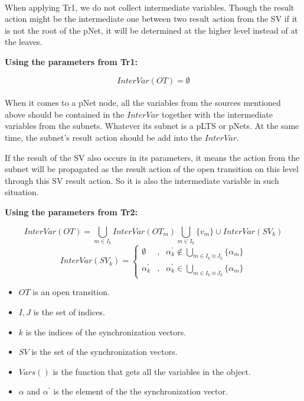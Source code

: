 \documentclass{lncs/llncs}
\begin{document}
\begin{definition}
\paragraph{}
When applying Tr1, we do not collect intermediate variables. Though the result action might be the intermediate one between two result action from the SV if it is not the root of the pNet, it will be determined at the higher level instead of at the leaves.

\begin{description}
	\item[{\bf Using the parameters from Tr1:}]
\end{description}

\[ InterVar(OT) = \emptyset \]

\paragraph{}
When it comes to a pNet node, all the variables from the sources mentioned above should be contained in the $InterVar$ together with the intermediate variables from the subnets. Whatever its subnet is a pLTS or pNets. At the same time, the subnet's result action should be add into the $InterVar$.

If the result of the SV also occurs in its parameters, it means the action from the subnet will be propagated as the result action of the open transition on this level through this SV result action. So it is also the intermediate variable in such situation.

\begin{description}
	\item[{\bf Using the parameters from Tr2:}]
\end{description}
\[ InterVar(OT) = \bigcup_{m\in I_k}{InterVar(OT_m)}  \bigcup_{m\in I_k}{\{v_m\}} \cup{InterVar(SV_k)} \]
$$ InterVar(SV_k)=\left\{
\begin{aligned}
\emptyset & , & \alpha_{k}^{'} \not\in \bigcup_{m\in I_k \uplus J_k}{\{\alpha_{m}\}}\\
{\alpha_{k}^{'}} & , & \alpha_{k}^{'} \in \bigcup_{m\in I_k \uplus J_k}{\{\alpha_{m}\}}
\end{aligned}
\right.
$$

\begin{itemize}
	\item $OT$ is an open transition.
	\item $I, J$ is the set of indices.
	\item $k$ is the indices of the synchronization vectors.
	\item $SV$ is the set of the synchronization vectors.
	\item $Vars()$ is the function that gets all the variables in the object.
	\item $\alpha$ and $\alpha^{'}$ is the element of the  the synchronization vector.
\end{itemize}
\end{definition}
\end{document}
